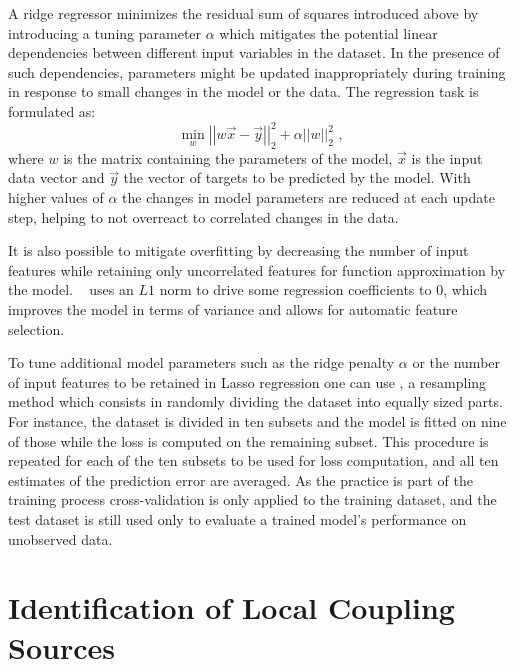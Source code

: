A ridge regressor minimizes the residual sum of squares introduced above by introducing a tuning parameter \(\alpha\) which mitigates the potential linear dependencies between different input variables in the dataset.
In the presence of such dependencies, parameters might be updated inappropriately during training in response to small changes in the model or the data.
The regression task is formulated as:
\begin{equation}
    \min _w \left|\left| w \vec{x} - \vec{y} \right|\right|_2^2 + \alpha \left|\left| w \right|\right|_2^2 \text{ ,}
    \label{equation:ridge_regression_regularization}
\end{equation}
where \(w\) is the matrix containing the parameters of the model, \(\vec{x}\) is the input data vector and \(\vec{y}\) the vector of targets to be predicted by the model.
With higher values of \(\alpha\) the changes in model parameters are reduced at each update step, helping to not overreact to correlated changes in the data.

It is also possible to mitigate overfitting by decreasing the number of input features while retaining only uncorrelated features for function approximation by the model.
~\cite{JRSS:Tibshirani:Regression_Shrinkage_Selection_Via_Lasso} uses an \(L1\) norm to drive some regression coefficients to \(0\), which improves the model in terms of variance and allows for automatic feature selection.

To tune additional model parameters such as the ridge penalty \(\alpha\) or the number of input features to be retained in Lasso regression one can use , a resampling method which consists in randomly dividing the dataset into equally sized parts.
For instance, the dataset is divided in ten subsets and the model is fitted on nine of those while the loss is computed on the remaining subset.
This procedure is repeated for each of the ten subsets to be used for loss computation, and all ten estimates of the prediction error are averaged.
As the practice is part of the training process cross-validation is only applied to the training dataset, and the test dataset is still used only to evaluate a trained model's performance on unobserved data.

\section{Identification of Local Coupling Sources}

